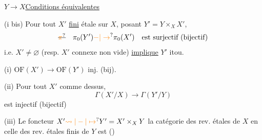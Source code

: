 $Y\longrightarrow X$\qquad\uline{Conditions équivalentes}

(i bis)  Pour tout $X'$ \uline{fini} étale sur $X$, posant $Y'=Y\times_X X'$,
\[
\deleted{\unsure{\pi}}\quad\pi_0(Y')\unsure{-|\to}\pi_0(X')\quad\text{est surjectif (bijectif)}
\]
i.e. $X'\ne\varnothing$ (resp. $X'$ connexe non vide) \uline{implique} $Y'$ itou.

(i) \quad $\mathrm{OF}(X')\to\mathrm{OF}(Y')$ inj. (bij).

(ii) Pour tout $X'$ comme dessus,
\[
\Gamma(X'/X)\longrightarrow\Gamma(Y'/Y)
\]
est injectif (bijectif)

(iii) Le foncteur $X'\unsure{\leadsto|-|\mapsto}Y'=X'\times_X Y$  la catégorie des rev. étales  de $X$ en celle des rev. étales finis de $Y$ est  ()


